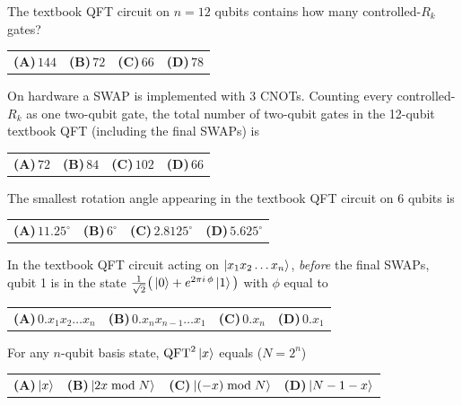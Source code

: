 \documentclass[11pt,a4paper]{article}
\newcommand{\optlabel}[1]{\textbf{(#1)}}
\newenvironment{qitem}[1]{\begin{list}{}{\setlength{\leftmargin}{3.3em}\setlength{\labelwidth}{3.1em}%
  \setlength{\labelsep}{0.2em}\setlength{\topsep}{3pt}\setlength{\parsep}{3pt}}\item[\textbf{Q.#1}\hfill]}{\end{list}}
\newcommand{\qsep}{\par\vspace{2pt}{\color{black!15}\hrule}\vspace{4pt}}
\begin{document}
\begin{qitem}{44}
The textbook QFT circuit on $n = 12$ qubits contains how many controlled-$R_k$ gates?
\par\smallskip\noindent\begin{tabularx}{\linewidth}{@{}*{4}{L}@{}}
\optlabel{A}\,$144$ & \optlabel{B}\,$72$ & \optlabel{C}\,$66$ & \optlabel{D}\,$78$
\end{tabularx}
\end{qitem}
\qsep

\begin{qitem}{45}
On hardware a SWAP is implemented with 3 CNOTs. Counting every controlled-$R_k$ as one two-qubit gate, the total number
of two-qubit gates in the 12-qubit textbook QFT (including the final SWAPs) is
\par\smallskip\noindent\begin{tabularx}{\linewidth}{@{}*{4}{L}@{}}
\optlabel{A}\,$72$ & \optlabel{B}\,$84$ & \optlabel{C}\,$102$ & \optlabel{D}\,$66$
\end{tabularx}
\end{qitem}
\qsep

\begin{qitem}{46}
The smallest rotation angle appearing in the textbook QFT circuit on $6$ qubits is
\par\smallskip\noindent\begin{tabularx}{\linewidth}{@{}*{4}{L}@{}}
\optlabel{A}\,$11.25^\circ$ & \optlabel{B}\,$6^\circ$ & \optlabel{C}\,$2.8125^\circ$ & \optlabel{D}\,$5.625^\circ$
\end{tabularx}
\end{qitem}
\qsep

\begin{qitem}{47}
In the textbook QFT circuit acting on $\ket{x_1x_2\dots x_n}$, \emph{before} the final SWAPs, qubit 1 is in the state
$\frac{1}{\sqrt2}\big(\ket0 + e^{2\pi i\,\phi}\ket1\big)$ with $\phi$ equal to
\par\smallskip\noindent\begin{tabularx}{\linewidth}{@{}*{4}{L}@{}}
\optlabel{A}\,$0.x_1x_2\dots x_n$ & \optlabel{B}\,$0.x_nx_{n-1}\dots x_1$ & \optlabel{C}\,$0.x_n$ & \optlabel{D}\,$0.x_1$
\end{tabularx}
\end{qitem}
\qsep

\begin{qitem}{48}
For any $n$-qubit basis state, $\mathrm{QFT}^2\ket{x}$ equals ($N = 2^n$)
\par\smallskip\noindent\begin{tabularx}{\linewidth}{@{}*{4}{L}@{}}
\optlabel{A}\,$\ket{x}$ & \optlabel{B}\,$\ket{2x \bmod N}$ & \optlabel{C}\,$\ket{(-x) \bmod N}$ & \optlabel{D}\,$\ket{N - 1 - x}$
\end{tabularx}
\end{qitem}
\qsep
\end{document}
